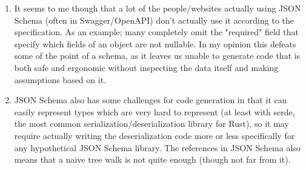 \begin{enumerate}
  \item It seems to me though that a lot of the people/websites actually using JSON Schema (often in Swagger/OpenAPI) don't actually use it according to the specification. As an example; many completely omit the "required" field that specify which fields of an object are not nullable. In my opinion this defeats some of the point of a schema, as it leaves us unable to generate code that is both safe and ergonomic without inspecting the data itself and making assumptions based on it.
  \item JSON Schema also has some challenges for code generation in that it can easily represent types which are very hard to represent (at least with serde, the most common serialization/deserialization library for Rust), so it may require actually writing the deserialization code more or less specifically for any hypothetical JSON Schema library. The references in JSON Schema also means that a naive tree walk is not quite enough (though not far from it).
\end{enumerate}


